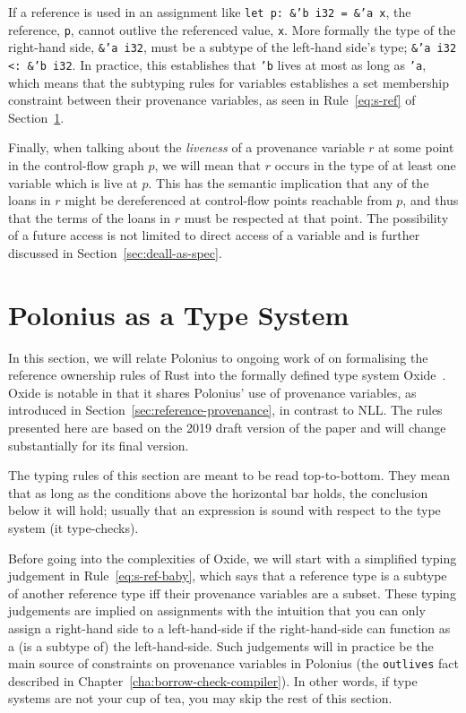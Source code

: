 \documentclass[11pt,a4paper,twoside,openany]{report}
\newcommand{\InRust}[1]{\texttt{#1}}
\newcommand{\InDatalog}[1]{\texttt{#1}}
\begin{document}
If a reference is used in an assignment like \InRust{let p: &'b i32 = &'a x},
the reference, \InRust{p}, cannot outlive the referenced value, \InRust{x}. More
formally the type of the right-hand side, \InRust{&'a i32}, must be a subtype of
the left-hand side's type; \InRust{&'a i32 <: &'b i32}. In practice, this
establishes that \InRust{'b} lives at most as long as \InRust{'a}, which means
that the subtyping rules for variables establishes a set membership constraint
between their provenance variables, as seen in Rule~\ref{eq:s-ref} of
Section~\ref{sec:type-system}.

Finally, when talking about the \emph{liveness} of a provenance variable $r$ at
some point in the control-flow graph $p$, we will mean that $r$ occurs in the
type of at least one variable which is live at $p$. This has the semantic
implication that any of the loans in $r$ might be dereferenced at control-flow
points reachable from $p$, and thus that the terms of the loans in $r$ must be
respected at that point. The possibility of a future access is not limited to
direct access of a variable and is further discussed in
Section~\ref{sec:deall-as-spec}.

\section{Polonius as a Type System}\label{sec:type-system}

In this section, we will relate Polonius to \citeauthor*{weiss_oxide:_2019}
ongoing work of \citeauthor*{weiss_oxide:_2019} on formalising the reference
ownership rules of Rust into the formally defined type system
Oxide~\cite{weiss_oxide:_2019}. Oxide is notable in that it shares Polonius' use
of provenance variables, as introduced in
Section~\ref{sec:reference-provenance}, in contrast to NLL. The rules presented
here are based on the 2019 draft version of the paper and will change
substantially for its final version.

The typing rules of this section are meant to be read top-to-bottom. They mean
that as long as the conditions above the horizontal bar holds, the conclusion
below it will hold; usually that an expression is sound with respect to the type
system (it type-checks).

Before going into the complexities of Oxide, we will start with a simplified
typing judgement in Rule~\eqref{eq:s-ref-baby}, which says that a reference type
is a subtype of another reference type iff their provenance variables are a
subset. These typing judgements are implied on assignments with the intuition
that you can only assign a right-hand side to a left-hand-side if the
right-hand-side can function as a (is a subtype of) the left-hand-side. Such
judgements will in practice be the main source of constraints on provenance
variables in Polonius (the \InDatalog{outlives} fact described in
Chapter~\ref{cha:borrow-check-compiler}). In other words, if type systems are
not your cup of tea, you may skip the rest of this section.
\end{document}

